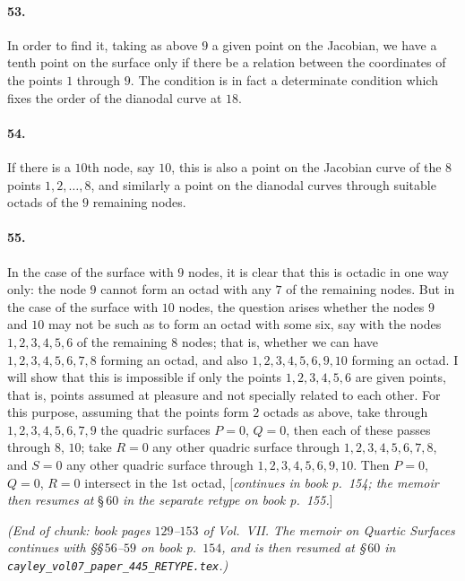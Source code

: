 \documentclass[11pt,a4paper]{article}
\begin{document}
\paragraph{53.}
In order to find it, taking as above $9$ a given point on the Jacobian, we have a tenth
point on the surface only if there be a relation between the coordinates of the points
$1$ through $9$. The condition is in fact a determinate condition which fixes the order
of the dianodal curve at $18$.

\paragraph{54.}
If there is a $10$th node, say $10$, this is also a point on the Jacobian curve of the
$8$ points $1, 2, \ldots, 8$, and similarly a point on the dianodal curves through
suitable octads of the $9$ remaining nodes.

\paragraph{55.}
In the case of the surface with $9$ nodes, it is clear that this is octadic in one way
only: the node $9$ cannot form an octad with any $7$ of the remaining nodes. But in the
case of the surface with $10$ nodes, the question arises whether the nodes $9$ and $10$
may not be such as to form an octad with some six, say with the nodes $1, 2, 3, 4, 5, 6$
of the remaining $8$ nodes; that is, whether we can have $1, 2, 3, 4, 5, 6, 7, 8$ forming
an octad, and also $1, 2, 3, 4, 5, 6, 9, 10$ forming an octad. I will show that this is
impossible if only the points $1, 2, 3, 4, 5, 6$ are given points, that is, points assumed
at pleasure and not specially related to each other. For this purpose, assuming that the
points form $2$ octads as above, take through $1, 2, 3, 4, 5, 6, 7, 9$ the quadric surfaces
$P = 0$, $Q = 0$, then each of these passes through $8$, $10$; take $R = 0$ any other
quadric surface through $1, 2, 3, 4, 5, 6, 7, 8$, and $S = 0$ any other quadric surface
through $1, 2, 3, 4, 5, 6, 9, 10$. Then $P = 0$, $Q = 0$, $R = 0$ intersect in the
$1$st octad, [\textit{continues in book p.\ 154; the memoir then resumes at}
\S\,$60$ \textit{in the separate retype on book p.\ 155.}]

\bigskip

\noindent\textit{(End of chunk: book pages $129$--$153$ of Vol.\ VII.
The memoir on Quartic Surfaces continues with \S\S\,$56$--$59$ on book p.\ $154$,
and is then resumed at \S\,$60$ in
\texttt{cayley\_vol07\_paper\_445\_RETYPE.tex}.)}
\end{document}
